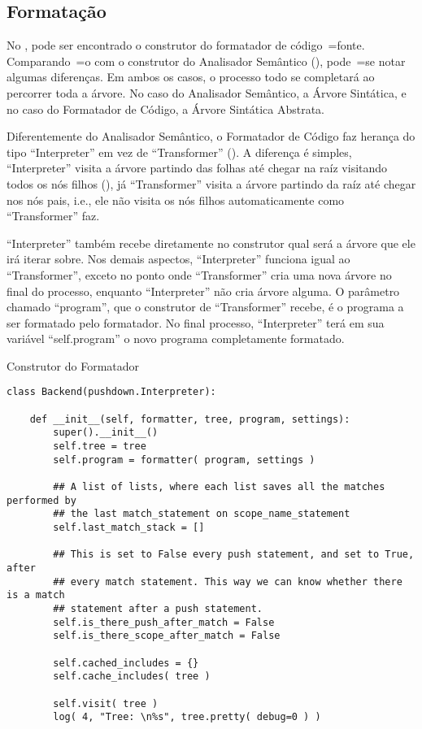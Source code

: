 \subsection{Formatação}

No ,
pode ser encontrado o construtor do formatador de código~=fonte.
Comparando~=o com o construtor do Analisador Semântico (),
pode~=se notar algumas diferenças.
Em ambos os casos,
o processo todo se completará ao percorrer toda a árvore.
No caso do Analisador Semântico,
a Árvore Sintática,
e no caso do Formatador de Código,
a Árvore Sintática Abstrata.

Diferentemente do Analisador Semântico,
o Formatador de Código faz herança do tipo ``Interpreter'' em vez de ``Transformer'' ().
A diferença é simples,
``Interpreter'' visita a árvore partindo das folhas até chegar na raíz visitando todos os nós filhos (),
já ``Transformer'' visita a árvore partindo da raíz até chegar nos nós pais,
i.e.,
ele não visita os nós filhos automaticamente como ``Transformer'' faz.

``Interpreter'' também recebe diretamente no construtor qual será a árvore que ele irá iterar sobre.
Nos demais aspectos,
``Interpreter'' funciona igual ao ``Transformer'',
exceto no ponto onde ``Transformer'' cria uma nova árvore no final do processo,
enquanto ``Interpreter'' não cria árvore alguma.
O parâmetro chamado ``program'',
que o construtor de ``Transformer'' recebe,
é o programa a ser formatado pelo formatador.
No final processo,
``Interpreter'' terá em sua variável ``self.program'' o novo programa completamente formatado.
\begin{code}
\caption{Construtor do Formatador}
\label{construtorDoFormatador}
\begin{verbatim}
class Backend(pushdown.Interpreter):

    def __init__(self, formatter, tree, program, settings):
        super().__init__()
        self.tree = tree
        self.program = formatter( program, settings )

        ## A list of lists, where each list saves all the matches performed by
        ## the last match_statement on scope_name_statement
        self.last_match_stack = []

        ## This is set to False every push statement, and set to True, after
        ## every match statement. This way we can know whether there is a match
        ## statement after a push statement.
        self.is_there_push_after_match = False
        self.is_there_scope_after_match = False

        self.cached_includes = {}
        self.cache_includes( tree )

        self.visit( tree )
        log( 4, "Tree: \n%s", tree.pretty( debug=0 ) )
\end{verbatim}
\end{code}

